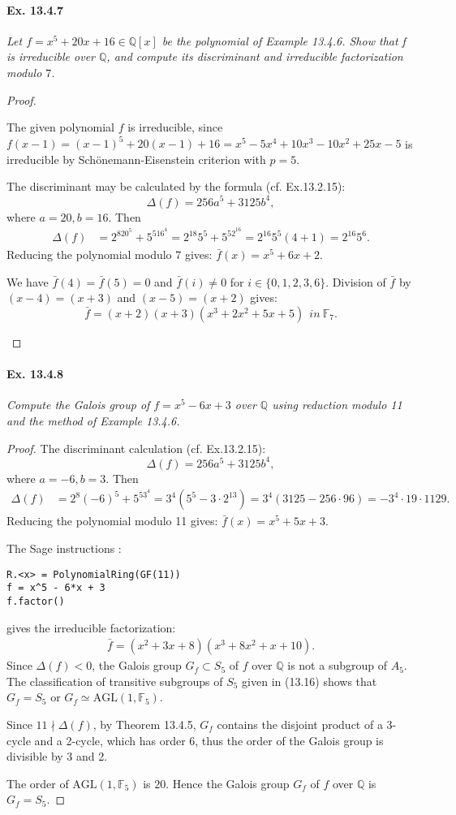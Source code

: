\documentclass[11pt,a4paper]{article}
\newcommand{\be} {\begin{enumerate}}
\newcommand{\ee} {\end{enumerate}}
\newcommand{\F}{\mathbb{F}}
\begin{document}
\paragraph{Ex. 13.4.7}

{\it Let $f=x^5+20x+16 \in \mathbb{Q}[x]$ be the polynomial of Example 13.4.6. Show that f is irreducible over $\mathbb{Q}$, and compute its discriminant and irreducible factorization modulo $7$.
\begin{proof}
\be
The given polynomial $f$ is irreducible, since $f(x-1)=(x-1)^5+20(x-1)+16=x^5-5x^4+10x^3-10x^2+25x-5$ is irreducible by Sch\"onemann-Eisenstein criterion with $p=5$.

The discriminant may be calculated by the formula (cf. Ex.13.2.15):
$$\Delta(f) = 256a^5+3125b^4,$$
where $a=20,b=16$. Then
\begin{align*}
\Delta(f) &= 2^820^5+5^516^4=2^{18}5^5+5^52^{16}=2^{16}5^5(4+1)=2^{16}5^6.
\end{align*}
Reducing the polynomial modulo 7 gives:
$\bar f(x)=x^5+6x+2$. 

We have $\bar f(4)=\bar f(5)=0$ and $\bar f(i)\ne 0$ for $i\in \{0,1,2,3,6\}$. Division of $\bar f$ by $(x-4)=(x+3)$ and $(x-5)=(x+2)$ gives:
$$\bar f=(x+2)(x+3)(x^3+2x^2+5x+5) ~~ in~\mathbb{F}_7.$$
\ee\end{proof}
}

\paragraph{Ex. 13.4.8}

{\it Compute the Galois group of  $f=x^5-6x+3$ over $\mathbb{Q}$ using reduction modulo 11 and the method of Example 13.4.6.
}
\begin{proof}

The discriminant calculation (cf. Ex.13.2.15):
$$\Delta(f) = 256a^5+3125b^4,$$
where $a=-6,b=3$. Then
\begin{align*}
\Delta(f) &= 2^8(-6)^5+5^53^4=3^4(5^5-3\cdot 2^{13})=3^4(3125-256\cdot96)=-3^4\cdot19\cdot1129.
\end{align*}
Reducing the polynomial modulo 11 gives:
$\bar f(x)=x^5+5x+3$.

The Sage instructions :
\begin{verbatim}
R.<x> = PolynomialRing(GF(11))
f = x^5 - 6*x + 3
f.factor()
\end{verbatim}
gives the irreducible factorization:
\begin{align*}
\bar f=(x^2 + 3x + 8)(x^3 + 8x^2 + x + 10).
\end{align*}
Since $\Delta(f)<0$, the Galois group $G_f\subset S_5$ of $f$ over $\mathbb{Q}$ is not a subgroup of $A_5$. The classification of transitive subgroups of $S_5$ given in (13.16) shows that $G_f =S_5$ or $G_f \simeq \mathrm{AGL}(1,\F_5)$.

 Since $11\nmid \Delta(f)$, by Theorem 13.4.5, $G_f$ contains the disjoint product of a 3-cycle and a 2-cycle, which has order $6$, thus the order of the Galois group is divisible by 3 and 2.

 The order of  $\mathrm{AGL}(1,\F_5)$ is $20$. Hence the Galois group $G_f$ of $f$ over $\mathbb{Q}$ is  $G_f = S_5$.

\end{proof}
\end{document}
